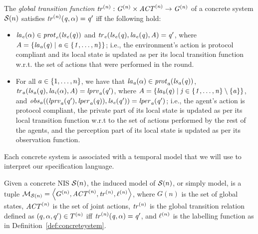 \begin{definition} 
  \label{def:globaltransition}
  The {\em global transition function} $\it{tr}^{(n)} : G^{(n)}
  \times \it{ACT}^{(n)} \rightarrow G^{(n)}$ of a concrete system $\mathcal{S}(n)$
  satisfies $\it{tr}^{(n)}(q, \alpha) = q'$ iff the following hold:
  \begin{itemize}
    \item $\it{la}_{e}({\alpha}) \in \it{prot}_{e}({\it{ls}_{e}(q)})$ and $\it{tr}_{e}(\it{ls}_{e}(q),
    \it{la}_{e}({q}), A) = q'$, where $A = \left \{ \it{la}_{a}({q}) \mid a \in
    \left \{ 1,\ldots,n \right \} \right \}$; i.e., the environment’s action is protocol compliant and
    its local state is updated as per its local transition function w.r.t. the
    set of actions that were performed in the round. 

    \item For all $a \in \left \{ 1,\ldots,n \right \}$, we have that $\it{la}_{a}({\alpha}) \in
    \it{prot}_{a}(\it{ls}_{a}(q))$, $\it{tr}_{a} (\it{ls}_{a}(q), \it{la}_{i}({\alpha}), A) = \it{lprv}_{a}(q')$,
    where $A = \left \{ \it{la}_{b}({q}) \mid j \in \left \{ 1,\ldots,n \right \} \setminus \left \{ a \right \} \right \}$,
    and $\it{obs}_{a}((\it{lprv}_{a}(q'),\it{lper}_{a}(q)),\it{ls}_{e}(q')) = \it{lper}_{a}(q')$; i.e.,
    the agent's action is protocol compliant, the private part of its local
    state is updated as per its local transition function w.r.t to the set of
    actions performed by the rest of the agents, and the perception part of its
    local state is updated as per its observation function.
  \end{itemize}
\end{definition}


Each concrete system is associated with a temporal model 
that we will use  to interpret our specification language.

\begin{definition}[Model]
  Given a concrete NIS $\mathcal{S}(n)$, the induced model of $\mathcal{S}(n)$, or simply model,
  is a tuple $\mathcal{M}_{\mathcal{S}(n)} = \left \langle G^{(n)}, \it{ACT}^{(n)}, \it{tr}^{(n)},
  \ell^{(n)} \right \rangle$, where $G(n)$ is the set of global states, $\it{ACT}^{(n)}$ is the
  set of joint actions, $\it{tr}^{(n)}$ is the global transition relation defined
  as $(q, \alpha, q') \in T^{(n)}$ iff $\it{tr}^{(n)}(q, \alpha) = q'$, and 
  $\ell^{(n)}$ is the labelling function as in
  Definition~\ref{def:concreteystem}.
  \end{definition}



